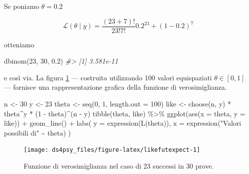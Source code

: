\documentclass[
  11pt,
]{krantz}
\makeatletter
\newenvironment{Shaded}{\begin{snugshade}}{\end{snugshade}}
\newcommand{\AttributeTok}[1]{\textcolor[rgb]{0.61,0.61,0.61}{#1}}
\newcommand{\CommentTok}[1]{\textcolor[rgb]{0.37,0.37,0.37}{\textit{#1}}}
\newcommand{\DecValTok}[1]{\textcolor[rgb]{0.06,0.06,0.06}{#1}}
\newcommand{\FloatTok}[1]{\textcolor[rgb]{0.06,0.06,0.06}{#1}}
\newcommand{\FunctionTok}[1]{\textcolor[rgb]{0,0,0}{#1}}
\newcommand{\NormalTok}[1]{#1}
\newcommand{\OtherTok}[1]{\textcolor[rgb]{0.37,0.37,0.37}{#1}}
\newcommand{\SpecialCharTok}[1]{\textcolor[rgb]{0,0,0}{#1}}
\newcommand{\StringTok}[1]{\textcolor[rgb]{0.5,0.5,0.5}{#1}}
\newenvironment{kframe}{%
\medskip{}
\setlength{\fboxsep}{.8em}
 \def\at@end@of@kframe{}%
 \ifinner\ifhmode%
  \def\at@end@of@kframe{\end{minipage}}%
  \begin{minipage}{\columnwidth}%
 \fi\fi%
 \def\FrameCommand##1{\hskip\@totalleftmargin \hskip-\fboxsep
 \colorbox{shadecolor}{##1}\hskip-\fboxsep
     \hskip-\linewidth \hskip-\@totalleftmargin \hskip\columnwidth}%
 \MakeFramed {\advance\hsize-\width
   \@totalleftmargin\z@ \linewidth\hsize
   \@setminipage}}%
 {\par\unskip\endMakeFramed%
 \at@end@of@kframe}
\renewenvironment{Shaded}{\begin{kframe}}{\end{kframe}}
\theoremstyle{definition}
\theoremstyle{definition}
\theoremstyle{definition}
\theoremstyle{definition}
\theoremstyle{remark}
\makeatother
\begin{document}
Se poniamo \(\theta = 0.2\)

\[
\mathcal{L}(\theta \mid y) = \frac{(23 + 7)!}{23!7!} 0.2^{23} + (1-0.2)^7
\]

otteniamo

\begin{Shaded}
\begin{Highlighting}[]
\FunctionTok{dbinom}\NormalTok{(}\DecValTok{23}\NormalTok{, }\DecValTok{30}\NormalTok{, }\FloatTok{0.2}\NormalTok{)}
\CommentTok{\#\textgreater{} [1] 3.581e{-}11}
\end{Highlighting}
\end{Shaded}

e così via. La figura \ref{fig:likefutexpect} --- costruita utilizzando 100 valori equispaziati \(\theta \in [0, 1]\) --- fornisce una rappresentazione grafica della funzione di verosimiglianza.

\begin{Shaded}
\begin{Highlighting}[]
\NormalTok{n }\OtherTok{\textless{}{-}} \DecValTok{30}
\NormalTok{y }\OtherTok{\textless{}{-}} \DecValTok{23}
\NormalTok{theta }\OtherTok{\textless{}{-}} \FunctionTok{seq}\NormalTok{(}\DecValTok{0}\NormalTok{, }\DecValTok{1}\NormalTok{, }\AttributeTok{length.out =} \DecValTok{100}\NormalTok{)}
\NormalTok{like }\OtherTok{\textless{}{-}} \FunctionTok{choose}\NormalTok{(n, y) }\SpecialCharTok{*}\NormalTok{ theta}\SpecialCharTok{\^{}}\NormalTok{y }\SpecialCharTok{*}\NormalTok{ (}\DecValTok{1} \SpecialCharTok{{-}}\NormalTok{ theta)}\SpecialCharTok{\^{}}\NormalTok{(n }\SpecialCharTok{{-}}\NormalTok{ y)}
\FunctionTok{tibble}\NormalTok{(theta, like) }\SpecialCharTok{\%\textgreater{}\%}
  \FunctionTok{ggplot}\NormalTok{(}\FunctionTok{aes}\NormalTok{(}\AttributeTok{x =}\NormalTok{ theta, }\AttributeTok{y =}\NormalTok{ like)) }\SpecialCharTok{+}
  \FunctionTok{geom\_line}\NormalTok{() }\SpecialCharTok{+}
  \FunctionTok{labs}\NormalTok{(}
    \AttributeTok{y =} \FunctionTok{expression}\NormalTok{(}\FunctionTok{L}\NormalTok{(theta)),}
    \AttributeTok{x =} \FunctionTok{expression}\NormalTok{(}\StringTok{"Valori possibili di"} \SpecialCharTok{\textasciitilde{}}\NormalTok{ theta)}
\NormalTok{  )}
\end{Highlighting}
\end{Shaded}

\begin{figure}[h]

{\centering \texttt{[image: ds4psy\_files/figure-latex/likefutexpect-1]} 

}

\caption{Funzione di verosimiglianza nel caso di 23 successi in 30 prove.}\label{fig:likefutexpect}
\end{figure}
\end{document}
